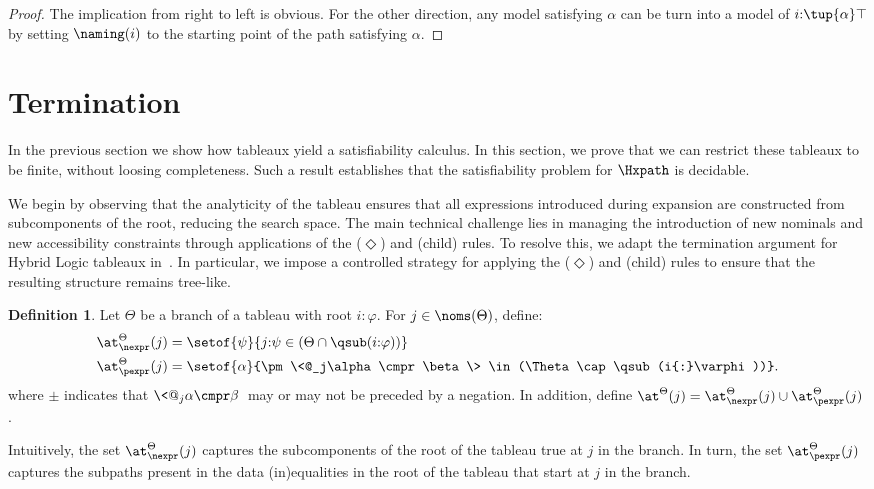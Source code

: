 \documentclass[10pt,a4paper]{amsart}
\theoremstyle{definition}
\newtheorem{defi}[thm]{Definition}
\theoremstyle{remark}
\begin{document}
\begin{proof}
	The implication from right to left is obvious.  For the other direction, any model satisfying $\alpha$ can be turn into a model of $i{:}\tup{\alpha}\top$ by setting $\naming(i)$ to the starting point of the path satisfying $\alpha$. 
\end{proof}	
	

\section{Termination}\label{sec:termination}

In the previous section we show how tableaux yield a satisfiability calculus.
In this section, we prove that we can restrict these tableaux to be finite, without loosing completeness.
Such a result establishes that the satisfiability problem for $\Hxpath$ is decidable.

We begin by observing that the analyticity of the tableau ensures that all expressions introduced during expansion are constructed from subcomponents of the root, reducing the search space. 
The main technical challenge lies in managing the introduction of new nominals and new accessibility constraints through applications of the ($\Diamond$) and (child) rules. 
To resolve this, we adapt the termination argument for Hybrid Logic tableaux in~\cite{BolanderB07}. In particular, we impose a controlled strategy for applying the ($\Diamond$) and (child) rules to ensure that the resulting structure remains tree-like. 

\begin{defi}
  \label{def:atform}
  Let $\Theta$ be a branch of a tableau with root $i{:}\varphi$.
  For $j \in \noms(\Theta)$, define:
  \begin{align*}
    \at_{\nexpr}^{\Theta}(j) & = \setof{\psi}{{j{:}\psi} \in (\Theta \cap \qsub(i{:}\varphi))} \\
    \at_{\pexpr}^{\Theta}(j) & = \setof{\alpha}{\pm \<@_j\alpha \cmpr \beta \> \in (\Theta \cap \qsub(i{:}\varphi))}.
  \end{align*}
  where $\pm$ indicates that $\<@_j\alpha \cmpr \beta \>$ may or may not be preceded by a negation.
  In addition, define $\at^\Theta(j) = \at_{\nexpr}^{\Theta}(j) \cup \at_{\pexpr}^{\Theta}(j)$.
\end{defi}

Intuitively, the set $\at_{\nexpr}^{\Theta}(j)$ captures the subcomponents of the root of the tableau true at $j$ in the branch.
In turn, the set $\at_{\pexpr}^{\Theta}(j)$ captures the subpaths present in the data (in)equalities in the root of the tableau that start at $j$ in the branch.
\end{document}
